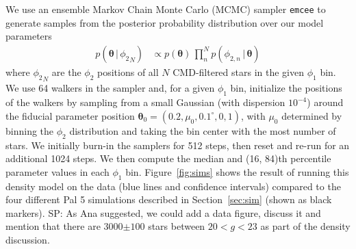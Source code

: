 \documentclass[twocolumn]{aastex62}
\newcommand{\bs}[1]{\boldsymbol{#1}}
\newcommand{\given}{\,|\,}
\newcommand{\sa}[1]{{\color{magenta} SP: #1}}
\begin{document}
We use an ensemble Markov Chain Monte Carlo (MCMC) sampler \texttt{emcee} \citep{Foreman-Mackey:2013} to generate samples from the posterior probability distribution over our model parameters
\begin{align}
    p(\bs{\theta} \given {\phi_2}_N) &\propto
        p(\bs{\theta}) \, \prod_n^N p(\phi_{2, n} \given \bs{\theta})
\end{align}
where ${\phi_2}_N$ are the $\phi_2$ positions of all $N$ CMD-filtered stars in the given $\phi_1$ bin.
We use 64 walkers in the sampler and, for a given $\phi_1$ bin, initialize the positions of the walkers by sampling from a small Gaussian (with dispersion $10^{-4}$) around the fiducial parameter position $\bs{\theta}_0 = (0.2, \mu_0, 0.1^\circ, 0, 1)$, with $\mu_0$ determined by binning the $\phi_2$ distribution and taking the bin center with the most number of stars.
We initially burn-in the samplers for 512 steps, then reset and re-run for an additional 1024 steps.
We then compute the median and (16, 84)th percentile parameter values in each $\phi_1$ bin.
Figure~\ref{fig:sims} shows the result of running this density model on the data (blue lines and confidence intervals) compared to the four different Pal 5 simulations described in Section~\ref{sec:sim} (shown as black markers). \sa{As Ana suggested, we could add a data figure, discuss it and mention that there are 3000$\pm 100$ stars between $20<g<23$ as part of the density discussion}.
\end{document}

